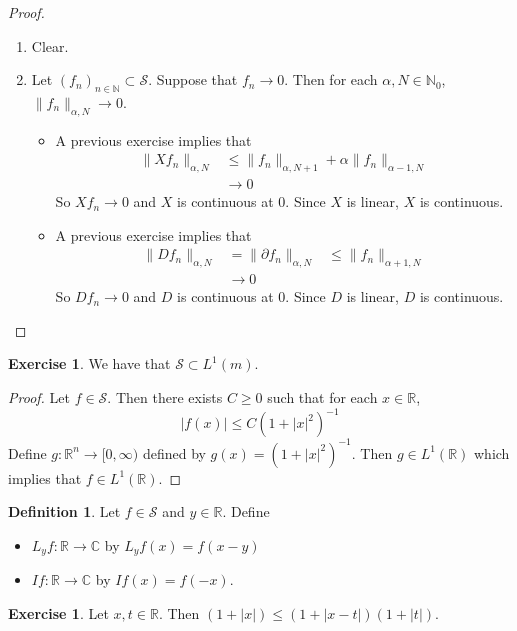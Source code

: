 \documentclass[12pt]{amsart}
\theoremstyle{definition}
\newtheorem{defn}[definition]{Definition}
\newtheorem{ex}[definition]{Exercise}
\newcommand{\p}{\partial}
\newcommand{\al}{\alpha}
\newcommand{\C}{\mathbb{C}}
\newcommand{\N}{\mathbb{N}}
\newcommand{\R}{\mathbb{R}}
\newcommand{\MS}{\mathcal{S}}
\newcommand{\Rg}{[0,\infty)}
\newcommand{\lex}[1]{\label{ex:#1}}
\begin{document}
	\begin{proof}\
		\begin{enumerate}
			\item Clear.
			\item Let $(f_n)_{n \in \N} \subset \MS$. Suppose that $f_n \rightarrow 0$. Then for each $\al, N \in \N_0$, $\|f_n\|_{\al, N} \rightarrow 0$.
			\begin{itemize}
				\item A previous exercise implies that 
				\begin{align*}
					\|Xf_n\|_{\al, N} 
					& \leq \|f_n\|_{\al, N+1} + \al \|f_n\|_{\al-1, N} \\
					& \rightarrow 0
				\end{align*}
				So $Xf_n \rightarrow 0$ and $X$ is continuous at $0$. Since $X$ is linear, $X$ is continuous.
				\item A previous exercise implies that 
				\begin{align*}
					\|Df_n\|_{\al, N} 
					& = \|\p f_n\|_{\al, N} 
					& \leq \|f_n\|_{\al+1, N}\\
					& \rightarrow 0
				\end{align*}
				So $Df_n \rightarrow 0$ and $D$ is continuous at $0$. Since $D$ is linear, $D$ is continuous. 
			\end{itemize}
		\end{enumerate}
	\end{proof}

	\begin{ex}
		\lex{102} We have that $ \MS \subset L^1(m)$.
	\end{ex}
	
	\begin{proof}
		Let $f \in \MS$. Then there exists $C \geq 0$ such that for each $x \in \R$, $$|f(x)| \leq C(1+|x|^{2})^{-1}$$
		Define $g:\R^n \rightarrow \Rg$ defined by $g(x) = (1+|x|^{2})^{-1}$. Then $g \in L^1(\R)$ which implies that $f \in L^1(\R)$.
	\end{proof}

	\begin{defn}
		Let $f \in \MS$ and $y \in \R$. Define 
		\begin{itemize}
			\item $L_yf: \R \rightarrow \C$ by $L_yf(x) = f(x-y)$
			\item $If: \R \rightarrow \C$ by $If(x) = f(-x)$.
		\end{itemize}
	\end{defn}

	\begin{ex}
		Let $x, t \in \R$. Then $(1+|x|) \leq (1+ |x-t|)(1 + |t|)$.
	\end{ex}
\end{document}

